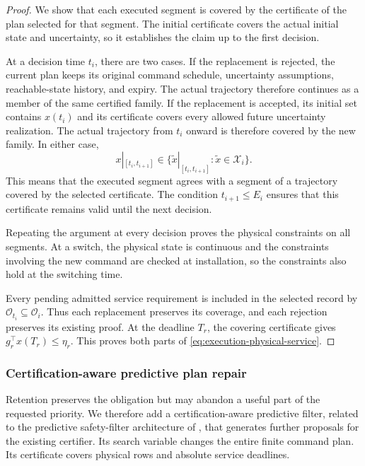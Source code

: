 \documentclass[preprint,12pt]{elsarticle}
\begin{document}
\begin{proof}
We show that each executed segment is covered by the certificate of the
plan selected for that segment. The initial certificate covers the actual
initial state and uncertainty, so it establishes the claim up to the first
decision.

At a decision time $t_i$, there are two cases. If the replacement is
rejected, the current plan keeps its original command schedule,
uncertainty assumptions, reachable-state history, and expiry. The actual
trajectory therefore continues as a member of the same certified family.
If the replacement is accepted, its initial set contains $x(t_i)$ and its
certificate covers every allowed future uncertainty realization. The
actual trajectory from $t_i$ onward is therefore covered by the new
family. In either case,
\[
 x|_{[t_i,t_{i+1}]}\in
 \{\widetilde x|_{[t_i,t_{i+1}]}:
          \widetilde x\in\mathcal X_i\}.
\]
This means that the executed segment agrees with a segment of a trajectory
covered by the selected certificate. The condition $t_{i+1}\le E_i$
ensures that this certificate remains valid until the next decision.

Repeating the argument at every decision proves the physical constraints
on all segments. At a switch, the physical state is continuous and the
constraints involving the new command are checked at installation, so the
constraints also hold at the switching time.

Every pending admitted service requirement is included in the selected
record by $\mathcal O_{t_i}\subseteq\mathcal O_i$. Thus each replacement
preserves its coverage, and each rejection preserves its existing proof.
At the deadline $T_r$, the covering certificate gives
$g_r^\top x(T_r)\le\eta_r$. This proves both parts of
\eqref{eq:execution-physical-service}.
\end{proof}


\subsubsection{Certification-aware predictive plan repair}
\label{sec:predictive-repair}

Retention preserves the obligation but may abandon a useful part of the
requested priority. We therefore add a certification-aware predictive filter, related
to the predictive safety-filter architecture of \cite{wabersich2021}, that
generates further proposals for the existing certifier. Its search variable
changes the entire finite command plan. Its certificate covers physical rows
and absolute service deadlines.
\end{document}
